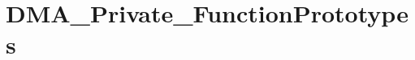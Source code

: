 \hypertarget{group___d_m_a___private___function_prototypes}{}\section{D\+M\+A\+\_\+\+Private\+\_\+\+Function\+Prototypes}
\label{group___d_m_a___private___function_prototypes}
